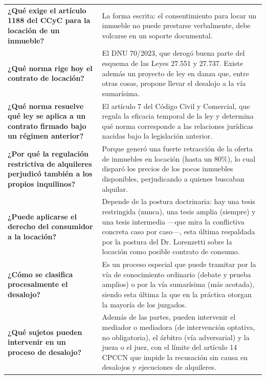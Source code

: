 \documentclass[12pt,oneside]{book}
\begin{document}
\begin{longtable}{
    >{\raggedright\arraybackslash}p{}
    >{\raggedright\arraybackslash}p{}
}
\textbf{¿Qué exige el artículo 1188 del CCyC para la locación de un inmueble?} &
La forma escrita: el consentimiento para locar un inmueble no puede prestarse verbalmente, debe volcarse en un soporte documental. \\

\textbf{¿Qué norma rige hoy el contrato de locación?} &
El DNU 70/2023, que derogó buena parte del esquema de las Leyes 27.551 y 27.737. Existe además un proyecto de ley en danza que, entre otras cosas, propone llevar el desalojo a la vía sumarísima. \\

\textbf{¿Qué norma resuelve qué ley se aplica a un contrato firmado bajo un régimen anterior?} &
El artículo 7 del Código Civil y Comercial, que regula la eficacia temporal de la ley y determina qué norma corresponde a las relaciones jurídicas nacidas bajo la legislación anterior. \\

\textbf{¿Por qué la regulación restrictiva de alquileres perjudicó también a los propios inquilinos?} &
Porque generó una fuerte retracción de la oferta de inmuebles en locación (hasta un 80\%), lo cual disparó los precios de los pocos inmuebles disponibles, perjudicando a quienes buscaban alquilar. \\

\textbf{¿Puede aplicarse el derecho del consumidor a la locación?} &
Depende de la postura doctrinaria: hay una tesis restringida (nunca), una tesis amplia (siempre) y una tesis intermedia —que mira la conflictiva concreta caso por caso—, esta última respaldada por la postura del Dr. Lorenzetti sobre la locación como posible contrato de consumo. \\

\textbf{¿Cómo se clasifica procesalmente el desalojo?} &
Es un proceso especial que puede tramitar por la vía de conocimiento ordinario (debate y prueba amplios) o por la vía sumarísima (más acotada), siendo esta última la que en la práctica otorgan la mayoría de los juzgados. \\

\textbf{¿Qué sujetos pueden intervenir en un proceso de desalojo?} &
Además de las partes, pueden intervenir el mediador o mediadora (de intervención optativa, no obligatoria), el árbitro (vía adversarial) y la jueza o el juez, con el límite del artículo 14 CPCCN que impide la recusación sin causa en desalojos y ejecuciones de alquileres. \\


\end{longtable}
\end{document}
